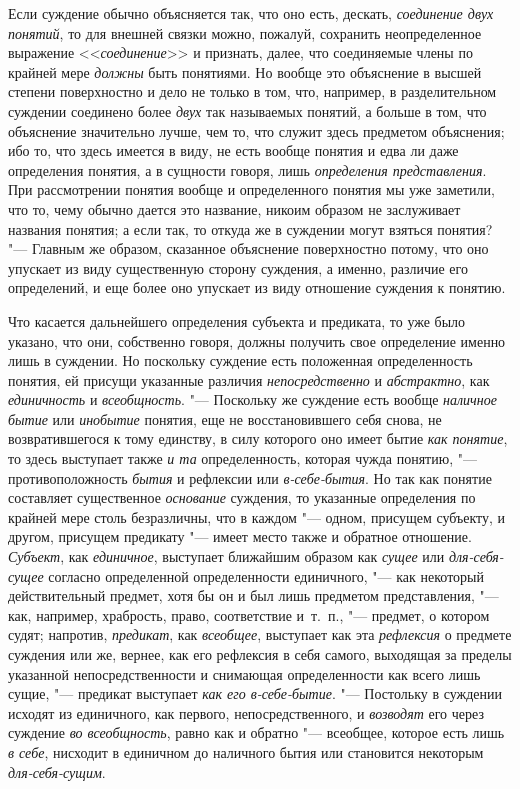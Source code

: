 Если суждение обычно объясняется так, что оно есть, дескать,
{\em соединение двух понятий},
то для внешней связки можно, пожалуй, сохранить
неопределенное выражение
<<{\em соединение}>> и
признать, далее, что соединяемые члены по крайней мере
{\em должны} быть
понятиями. Но вообще это объяснение в высшей степени поверхностно и дело не
только в том, что, например, в разделительном суждении соединено более
{\em двух} так называемых
понятий, а больше в том, что объяснение значительно лучше, чем то, что
служит здесь предметом объяснения; ибо то, что здесь имеется в виду, не
есть вообще понятия и едва ли даже определения понятия, а в сущности
говоря, лишь {\em определения
представления}. При рассмотрении понятия вообще и
определенного понятия мы уже заметили, что то, чему обычно дается это
название, никоим образом не заслуживает названия понятия; а если так, то
откуда же в суждении могут взяться понятия? "--- Главным же
образом, сказанное объяснение поверхностно потому, что оно упускает из виду
существенную сторону суждения, а именно, различие его определений, и еще
более оно упускает из виду отношение суждения к понятию.

Что касается дальнейшего определения субъекта и предиката, то
уже было указано, что они, собственно говоря, должны получить свое
определение именно лишь в суждении. Но поскольку суждение есть положенная
определенность понятия, ей присущи указанные различия
{\em непосредственно} и
{\em абстрактно}, как
{\em единичность} и
{\em всеобщность}. "---
Поскольку же суждение есть вообще
{\em наличное бытие} или
{\em инобытие} понятия,
еще не восстановившего себя снова, не возвратившегося к тому единству, в
силу которого оно имеет бытие {\em как
понятие}, то здесь выступает также
{\em и та}
определенность, которая чужда понятию, "---
противоположность
{\em бытия} и рефлексии
или {\em в-себе-бытия}.
Но так как понятие составляет существенное
{\em основание} суждения,
то указанные определения по крайней мере столь безразличны, что в каждом
"--- одном, присущем субъекту, и другом, присущем предикату
"--- имеет место также и обратное отношение.
{\em Субъект}, как
{\em единичное},
выступает ближайшим образом как
{\em сущее} или
{\em для-себя-сущее}
согласно определенной определенности единичного, "---
как некоторый действительный предмет, хотя бы он и был лишь
предметом представления, "--- как, например, храбрость, право,
соответствие и~т.~п., "--- предмет, о котором судят; напротив,
{\em предикат}, как
{\em всеобщее}, выступает
как эта {\em рефлексия} о
предмете суждения или же, вернее, как его рефлексия в себя самого,
выходящая за пределы указанной непосредственности и снимающая
определенности как всего лишь сущие, "--- предикат выступает
{\em как его в-себе-бытие}. "---
Постольку в суждении исходят из единичного, как первого,
непосредственного, и {\em возводят}
его через суждение {\em во
всеобщность}, равно как и обратно "--- всеобщее,
которое есть лишь {\em в себе},
нисходит в единичном до наличного бытия или становится
некоторым {\em для-себя-сущим}.

